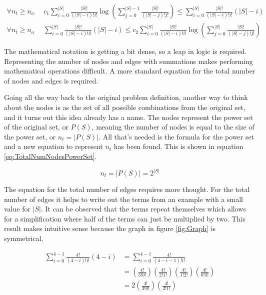 \documentclass{article}
\begin{document}
\begin{equation}
    \begin{split}
        \forall n_t\ge n_o \;\; &
        c_1\sum_{i=0}^{|S|}\frac{|S|!}{(|S|-i)!i!}
        \log \left( \sum_{j=0}^{|S|-1}\frac{|S|!}{(|S|-j)!j!} \right)
        \le
        \sum_{i=0}^{|S|}\frac{|S|!}{(|S|-i)!i!}(|S|-i)
        \\
        \forall n_t\ge n_o \;\; &
        \sum_{i=0}^{|S|}\frac{|S|!}{(|S|-i)!i!}(|S|-i)
        \le
        c_2\sum_{i=0}^{|S|}\frac{|S|!}{(|S|-i)!i!}
        \log \left( \sum_{j=0}^{|S|}\frac{|S|!}{(|S|-j)!j!} \right)
    \end{split}
    \label{eq:nlognInequality}
\end{equation}

The mathematical notation is getting a bit dense, so a leap in logic is required. Representing the number of nodes and edges with summations makes performing mathematical operations difficult. A more standard equation for the total number of nodes and edges is required.

Going all the way back to the original problem definition, another way to think about the nodes is as the set of all possible combinations from the original set, and it turns out this idea already has a name. The nodes represent the power set of the original set, or $P(S)$, meaning the number of nodes is equal to the size of the power set, or $n_t=|P(S)|$. All that's needed is the formula for the power set and a new equation to represent $n_t$ has been found. This is shown in equation \ref{eq:TotalNumNodesPowerSet}.

\begin{equation}
    n_t=|P(S)|=2^{|S|}
    \label{eq:TotalNumNodesPowerSet}
\end{equation}

The equation for the total number of edges requires more thought. For the total number of edges it helps to write out the terms from an example with a small value for $|S|$. It can be observed that the terms repeat themselves which allows for a simplification where half of the terms can just be multiplied by two. This result makes intuitive sense because the graph in figure \ref{fig:Graph} is symmetrical.

\begin{equation*}
    \begin{split}
        \sum_{i=0}^{4-1}\frac{4!}{(4-i)!i!}(4-i)&=
        \sum_{i=0}^{4-1}\frac{4!}{(4-i-1)!i!}
        \\
        &=
        \left(\frac{4!}{3!0!}\right)
        \left(\frac{4!}{2!1!}\right)
        \left(\frac{4!}{1!2!}\right)
        \left(\frac{4!}{0!3!}\right)
        \\
        &=
        2
        \left(\frac{4!}{3!0!}\right)
        \left(\frac{4!}{2!1!}\right)
    \end{split}
\end{equation*}
\end{document}
